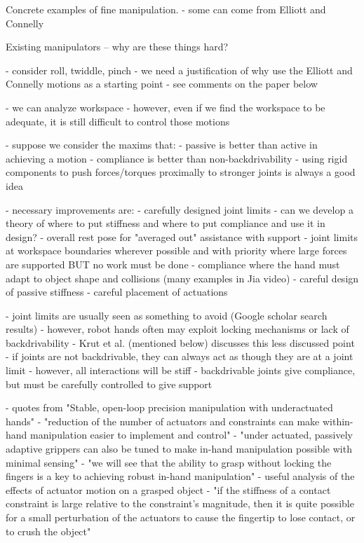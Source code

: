Concrete examples of fine manipulation.
	- some can come from Elliott and Connelly

Existing manipulators -- why are these things hard?

	- consider roll, twiddle, pinch
		- we need a justification of why use the Elliott and Connelly motions as a starting point
			- see comments on the paper below

	- we can analyze workspace
		- however, even if we find the workspace to be adequate, it is still difficult to control those motions
		
	- suppose we consider the maxims that:
		- passive is better than active in achieving a motion
		- compliance is better than non-backdrivability
		- using rigid components to push forces/torques proximally to stronger joints is always a good idea
		
	- necessary improvements are:
		- carefully designed joint limits
			- can we develop a theory of where to put stiffness and where to put compliance and use it in design?
				- overall rest pose for "averaged out" assistance with support
				- joint limits at workspace boundaries wherever possible and with priority where large forces are supported BUT no work must be done
				- compliance where the hand must adapt to object shape and collisions (many examples in Jia video)
		- careful design of passive stiffness
		- careful placement of actuations
		
	- joint limits are usually seen as something to avoid (Google scholar search results)
		- however, robot hands often may exploit locking mechanisms or lack of backdrivability 
			- Krut et al. (mentioned below) discusses this less discussed point
			- if joints are not backdrivable, they can always act as though they are at a joint limit
			- however, all interactions will be stiff
		- backdrivable joints give compliance, but must be carefully controlled to give support
		
	- quotes from "Stable, open-loop precision manipulation with underactuated hands"	
		- "reduction of the number of actuators and constraints can make within-hand manipulation easier to implement and control"
		- "under actuated, passively adaptive grippers can also be tuned to make in-hand manipulation possible with minimal sensing"
		- "we will see that the ability to grasp without locking the fingers is a key to achieving robust in-hand manipulation"
		- useful analysis of the effects of actuator motion on a grasped object
		- "if the stiffness of a contact constraint is large relative to the constraint's magnitude, then it is quite possible for a small perturbation of the actuators to cause the fingertip to lose contact, or to crush the object"
		
